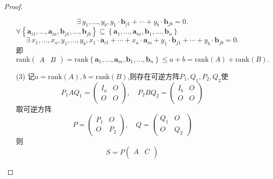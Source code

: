 \documentclass{article}
\begin{document}
\begin{enumerate}
\begin{proof}
\begin{enumerate}
\[                    \exists \ y_1,\ldots,y_b,y_1\cdot\boldsymbol{b}_{j1}+\cdots+y_b\cdot\boldsymbol{b}_{jb}=0.
                \]
                $\forall \left\{\boldsymbol{a}_{i1},\ldots,\boldsymbol{a}_{ia},\boldsymbol{b}_{j1},\ldots,\boldsymbol{b}_{jb}\right\}
                    \subseteq  \left\{\boldsymbol{a}_1,\ldots,\boldsymbol{a}_m,\boldsymbol{b}_1,\ldots,\boldsymbol{b}_n\right\}$
                \[
                    \exists \ x_1,\ldots,x_a,y_1,\ldots,y_b,
                    x_1\cdot\boldsymbol{a}_{i1}+\cdots+x_a\cdot\boldsymbol{a}_{ia}
                    +y_1\cdot\boldsymbol{b}_{j1}+\cdots+y_b\cdot\boldsymbol{b}_{jb}=0.
                \]
                即
                \[
                    \mbox{rank}
                    \begin{pmatrix}
                        A & B
                    \end{pmatrix}=
                    \mbox{rank}
                    \left\{\boldsymbol{a}_1,\ldots,\boldsymbol{a}_m,\boldsymbol{b}_1,\ldots,\boldsymbol{b}_n\right\}
                    \leqslant a+b=\mbox{rank}(A)+\mbox{rank}(B).
                \]
                \item [(3)]记$a=\mbox{rank}(A),b=\mbox{rank}(B)$,则存在可逆方阵$P_1,Q_1,P_2,Q_2$使
                \[
                    P_1 A Q_1=\begin{pmatrix}
                        I_a & O\\
                        O & O
                    \end{pmatrix},\quad
                    P_2 B Q_2=\begin{pmatrix}
                        I_b & O\\
                        O & O
                    \end{pmatrix}
                \]
                取可逆方阵
                \[
                    P=\begin{pmatrix}
                        P_1 & O\\
                        O & P_2
                    \end{pmatrix},\quad
                    Q=\begin{pmatrix}
                        Q_1 & O\\
                        O & Q_2
                    \end{pmatrix}
                \]
                则
                \[
                    S=P\begin{pmatrix}
                        A & C\\

\end{pmatrix}\]
\end{enumerate}
\end{proof}
\end{enumerate}
\end{document}
